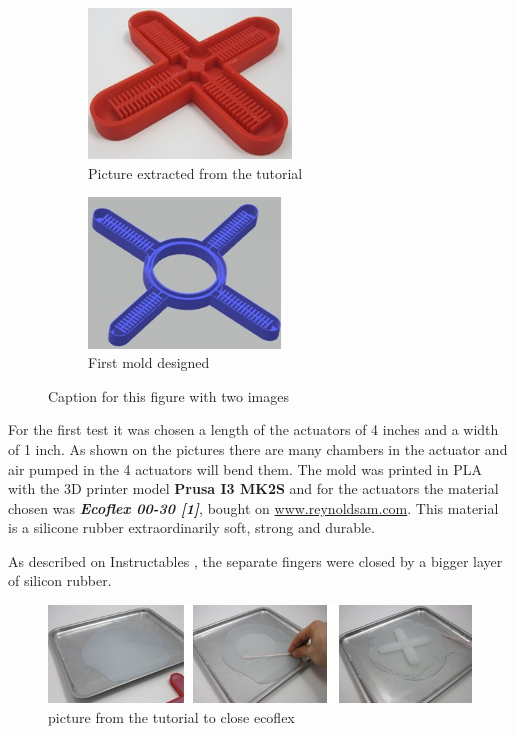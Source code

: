 \documentclass{article}
\begin{document}
\begin{figure}[h]
\begin{subfigure}{0.5\textwidth}
\includegraphics[width=0.8\linewidth, height=4cm]{Pictures/moldFromTutorial.jpg} 
\caption{Picture extracted from the tutorial}
\label{fig:moldTut}
\end{subfigure}
\begin{subfigure}{0.5\textwidth}
\includegraphics[width=0.8\linewidth, height=4cm]{Pictures/OurFirstMold.jpg}
\caption{First mold designed}
\label{fig:subim2}
\end{subfigure}
 
\caption{Caption for this figure with two images}
\label{fig:image2}
\end{figure}

For the first test it was chosen a length of the actuators of 4 inches and a width of 1 inch. 
As shown on the pictures there are many chambers in the actuator and air pumped in the 4 actuators will bend them. 
The mold was printed in PLA with the 3D printer model \textbf{Prusa I3 MK2S} and for the actuators the material chosen was \textbf{\textit{Ecoflex 00-30 [1]}}, bought on \underline{www.reynoldsam.com}. This material is a silicone rubber extraordinarily soft, strong and durable.

As described on Instructables \cite{Air-Powered Soft Robot Gripper}, the separate fingers were closed by a bigger layer of silicon rubber.

\begin{figure} [h]
    \centering
    \includegraphics[width=1\textwidth]{Pictures/StepCloseFingers.jpg}
    \caption{picture from the tutorial to close ecoflex}
    \label{fig:tutorialProcess}
\end{figure}
\end{document}
